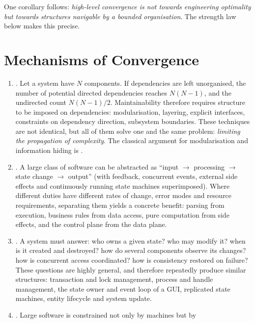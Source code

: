 One corollary follows: \emph{high-level convergence is not towards engineering optimality
but towards structures navigable by a bounded organisation}. The strength law below makes
this precise.

\section{Mechanisms of Convergence}\label{sec:mechanisms}

\begin{enumerate}[label=(M\arabic*)]
\item {}. Let a system have $N$ components. If dependencies are
      left unorganised, the number of potential directed dependencies reaches $N(N-1)$, and
      the undirected count $N(N-1)/2$. Maintainability therefore requires structure to be
      imposed on dependencies: modularisation, layering, explicit interfaces, constraints on
      dependency direction, subsystem boundaries. These techniques are not identical, but
      all of them solve one and the same problem: \emph{limiting the propagation of
      complexity}. The classical argument for modularisation and information hiding is
      \cite{parnas1972}.
\item {}. A large class of software can be abstracted as
      ``input $\to$ processing $\to$ state change $\to$ output'' (with feedback, concurrent
      events, external side effects and continuously running state machines superimposed).
      Where different duties have different rates of change, error modes and resource
      requirements, separating them yields a concrete benefit: parsing from execution,
      business rules from data access, pure computation from side effects, and the control
      plane from the data plane.
\item {}. A system must answer: who owns a given state? who
      may modify it? when is it created and destroyed? how do several components observe its
      changes? how is concurrent access coordinated? how is consistency restored on failure?
      These questions are highly general, and therefore repeatedly produce similar
      structures: transaction and lock management, process and handle management, the state
      owner and event loop of a GUI, replicated state machines, entity lifecycle and system
      update.
\item {}. Large software is constrained not only by machines but by

\end{enumerate}
